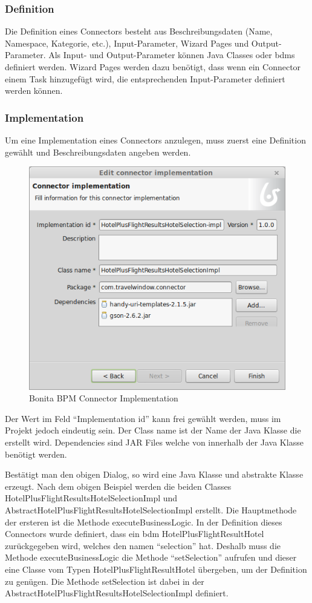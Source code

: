 \subsubsection{Definition}
Die Definition eines Connectors besteht aus Beschreibungsdaten (Name, Namespace, Kategorie, etc.), Input-Parameter, Wizard Pages und Output-Parameter. Als Input- und Output-Parameter können Java Classes oder \glspl{bdm} definiert werden. Wizard Pages werden dazu benötigt, dass wenn ein Connector einem Task hinzugefügt wird, die entsprechenden Input-Parameter definiert werden können.

\subsubsection{Implementation}
Um eine Implementation eines Connectors anzulegen, muss zuerst eine Definition gewählt und Beschreibungsdaten angeben werden.
\begin{figure}[H]
	\centering
	\includegraphics[width=1\textwidth]{images/bonita-connectors-implementation.png}
	\caption{Bonita BPM Connector Implementation}
	\label{fig:analyse:bonita:connectors:implementation}
\end{figure}
Der Wert im Feld "`Implementation id"' kann frei gewählt werden, muss im Projekt jedoch eindeutig sein. Der Class name ist der Name der Java Klasse die erstellt wird. Dependencies sind JAR Files welche von innerhalb der Java Klasse benötigt werden.

Bestätigt man den obigen Dialog, so wird eine Java Klasse und abstrakte Klasse erzeugt. Nach dem obigen Beispiel werden die beiden Classes HotelPlusFlightResultsHotelSelectionImpl und AbstractHotelPlusFlightResultsHotelSelectionImpl erstellt. Die Hauptmethode der ersteren ist die Methode executeBusinessLogic. In der Definition dieses Connectors wurde definiert, dass ein \gls{bdm} HotelPlusFlightResultHotel zurückgegeben wird, welches den namen "`selection"' hat. Deshalb muss die Methode executeBusinessLogic die Methode "`setSelection"' aufrufen und dieser eine Classe vom Typen HotelPlusFlightResultHotel übergeben, um der Definition zu genügen. 
Die Methode setSelection ist dabei in der AbstractHotelPlusFlightResultsHotelSelectionImpl definiert.


